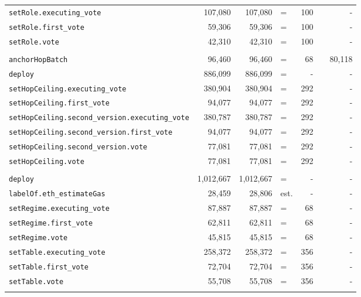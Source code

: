 \documentclass[10pt]{article}
\begin{document}
{\begin{longtable}{@{}lrrlrcr@{}}
\quad\texttt{setRole.executing\_vote} & 107{,}080 & 107{,}080 & = & 100 &  & - \\
\quad\texttt{setRole.first\_vote} & 59{,}306 & 59{,}306 & = & 100 &  & - \\
\quad\texttt{setRole.vote} & 42{,}310 & 42{,}310 & = & 100 &  & - \\
\addlinespace[3pt]
\multicolumn{7}{@{}l}{\textbf{\texttt{HopRegistry}}}\\
\quad\texttt{anchorHopBatch} & 96{,}460 & 96{,}460 & = & 68 &  & 80{,}118 \\
\quad\texttt{deploy} & 886{,}099 & 886{,}099 & = & - &  & - \\
\quad\texttt{setHopCeiling.executing\_vote} & 380{,}904 & 380{,}904 & = & 292 &  & - \\
\quad\texttt{setHopCeiling.first\_vote} & 94{,}077 & 94{,}077 & = & 292 &  & - \\
\quad\texttt{setHopCeiling.second\_version.executing\_vote} & 380{,}787 & 380{,}787 & = & 292 &  & - \\
\quad\texttt{setHopCeiling.second\_version.first\_vote} & 94{,}077 & 94{,}077 & = & 292 &  & - \\
\quad\texttt{setHopCeiling.second\_version.vote} & 77{,}081 & 77{,}081 & = & 292 &  & - \\
\quad\texttt{setHopCeiling.vote} & 77{,}081 & 77{,}081 & = & 292 &  & - \\
\addlinespace[3pt]
\multicolumn{7}{@{}l}{\textbf{\texttt{LabelPolicy}}}\\
\quad\texttt{deploy} & 1{,}012{,}667 & 1{,}012{,}667 & = & - &  & - \\
\quad\texttt{labelOf.eth\_estimateGas} & 28{,}459 & 28{,}806 & est. & - &  & - \\
\quad\texttt{setRegime.executing\_vote} & 87{,}887 & 87{,}887 & = & 68 &  & - \\
\quad\texttt{setRegime.first\_vote} & 62{,}811 & 62{,}811 & = & 68 &  & - \\
\quad\texttt{setRegime.vote} & 45{,}815 & 45{,}815 & = & 68 &  & - \\
\quad\texttt{setTable.executing\_vote} & 258{,}372 & 258{,}372 & = & 356 &  & - \\
\quad\texttt{setTable.first\_vote} & 72{,}704 & 72{,}704 & = & 356 &  & - \\
\quad\texttt{setTable.vote} & 55{,}708 & 55{,}708 & = & 356 &  & - \\
\addlinespace[3pt]
\multicolumn{7}{@{}l}{\textbf{\texttt{StaticRules}}}\\

\end{longtable}}
\end{document}
